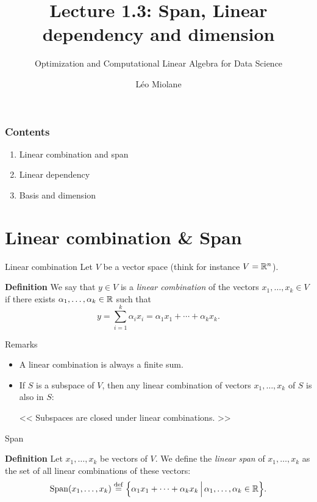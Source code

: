 \documentclass{beamer}
\title{Lecture 1.3: Span, Linear dependency and dimension}
\subtitle{Optimization and Computational Linear Algebra for Data Science}
\author{Léo Miolane}
\date{}
\begin{document}
\setcounter{showProgressBar}{0}
\setcounter{showSlideNumbers}{0}

\frame{\titlepage}

\begin{frame}
	\frametitle{Contents}
	\begin{enumerate}
		\item Linear combination and span
		\item Linear dependency
		\item Basis and dimension
	\end{enumerate}
\end{frame}


\setcounter{framenumber}{0}
\setcounter{showSlideNumbers}{1}

\section{Linear combination \& Span}

\begin{frame}[t]{Linear combination}
	Let $V$ be a vector space (think for instance $V=\mathbb{R}^n$).
	\begin{block}{\bf Definition}
		We say that $y \in V$ is a \emph{linear combination} of the vectors $x_1, \dots, x_k \in V$ if there exists $\alpha_1, \dots, \alpha_k \in \mathbb{R}$ such that
		$$
		y = \sum_{i=1}^k \alpha_i x_i = \alpha_1 x_1 + \cdots + \alpha_k x_k.
		$$
	\end{block}
\end{frame}


\begin{frame}[t]{Remarks}
	\begin{itemize}
		\item A linear combination is always a finite sum.
		\item If $S$ is a subspace of $V$, then any linear combination of vectors $x_1, \dots, x_k$ of $S$ is also in $S$:
			\begin{center}
				<< Subspaces are closed under linear combinations. >>
			\end{center}
	\end{itemize}
\end{frame}


\begin{frame}[t]{Span}
	\begin{block}{\bf Definition}
		Let $x_1, \dots, x_k$ be vectors of $V$. We define the \emph{linear span} of $x_1, \dots, x_k$ as the set of all linear combinations of these vectors:
		$$
		{{\rm Span}}(x_1, \dots, x_k) \overset{\rm def}{=}
		\Big\{ \alpha_1 x_1 + \cdots + \alpha_k x_k \, \Big| \, \alpha_1, \dots, \alpha_k \in \mathbb{R} \Big\}.
		$$
	\end{block}
\end{frame}
\end{document}
